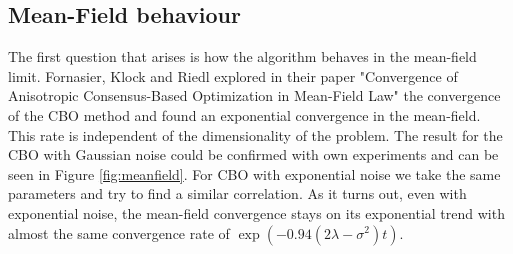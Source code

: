 \documentclass[a4paper, 11pt]{article}
\begin{document}
\subsection{Mean-Field behaviour}
The first question that arises is how the algorithm behaves in the mean-field limit. Fornasier, Klock and Riedl explored in their paper "Convergence of Anisotropic Consensus-Based
Optimization in Mean-Field Law" the convergence of the CBO method and found an exponential convergence in the mean-field. This rate is independent of the dimensionality of the problem. The result for the CBO with Gaussian noise could be confirmed with own experiments and can be seen in Figure \ref{fig:meanfield}.
For CBO with exponential noise we take the same parameters and try to find a similar correlation. As it turns out, even with exponential noise, the mean-field convergence stays on its exponential trend with almost the same convergence rate of $\exp(-0.94(2\lambda-\sigma^2) t)$. 
\end{document}
